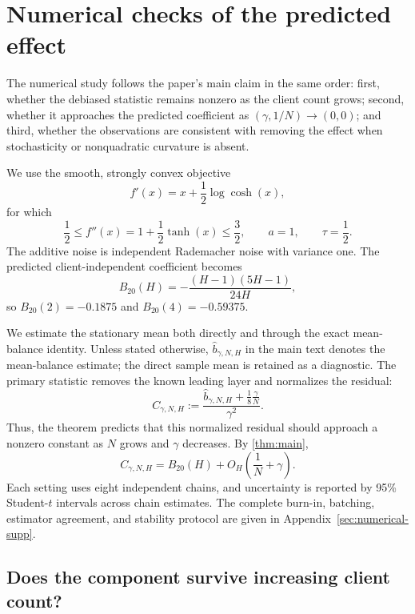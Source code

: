 \documentclass[11pt]{article}
\theoremstyle{definition}
\begin{document}
\section{Numerical checks of the predicted effect}
\label{sec:numerics}

The numerical study follows the paper's main claim in the same order: first, whether the debiased statistic remains nonzero as the client count grows; second, whether it approaches the predicted coefficient as $(\gamma,1/N)\to(0,0)$; and third, whether the observations are consistent with removing the effect when stochasticity or nonquadratic curvature is absent.

We use the smooth, strongly convex objective
\begin{equation}
\label{eq:sim-objective}
f'(x)=x+\frac12\log\cosh(x),
\end{equation}
for which
\[
\frac12\le f''(x)=1+\frac12\tanh(x)\le\frac32,
\qquad a=1,\qquad \tau=\frac12.
\]
The additive noise is independent Rademacher noise with variance one. The predicted client-independent coefficient becomes
\begin{equation}
\label{eq:sim-B}
B_{20}(H)=-\frac{(H-1)(5H-1)}{24H},
\end{equation}
so $B_{20}(2)=-0.1875$ and $B_{20}(4)=-0.59375$.

We estimate the stationary mean both directly and through the exact mean-balance identity. Unless stated otherwise, $\hat b_{\gamma, N, H}$ in the main text denotes the mean-balance estimate; the direct sample mean is retained as a diagnostic. The primary statistic removes the known leading layer and normalizes the residual:
\begin{equation}
\label{eq:Csim}
C_{\gamma, N, H}
:=\frac{\hat b_{\gamma,N,H}+\frac18\frac{\gamma}{N}}{\gamma^2}.
\end{equation}
Thus, the theorem predicts that this normalized residual should approach a nonzero constant as $N$ grows and $\gamma$ decreases.
By \cref{thm:main},
\begin{equation}
\label{eq:Csim-prediction}
C_{\gamma,N,H}=B_{20}(H)+O_H\!\left(\frac1N+\gamma\right).
\end{equation}
Each setting uses eight independent chains, and uncertainty is reported by 95\% Student-$t$ intervals across chain estimates. The complete burn-in, batching, estimator agreement, and stability protocol are given in Appendix~\ref{sec:numerical-supp}.

\subsection{Does the component survive increasing client count?}
\label{sec:num-client}
\end{document}
